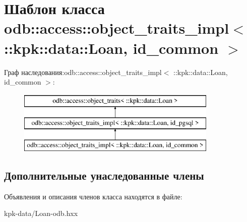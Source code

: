 \hypertarget{classodb_1_1access_1_1object__traits__impl_3_01_1_1kpk_1_1data_1_1_loan_00_01id__common_01_4}{}\section{Шаблон класса odb\+:\+:access\+:\+:object\+\_\+traits\+\_\+impl$<$ \+:\+:kpk\+:\+:data\+:\+:Loan, id\+\_\+common $>$}
\label{classodb_1_1access_1_1object__traits__impl_3_01_1_1kpk_1_1data_1_1_loan_00_01id__common_01_4}
Граф наследования\+:odb\+:\+:access\+:\+:object\+\_\+traits\+\_\+impl$<$ \+:\+:kpk\+:\+:data\+:\+:Loan, id\+\_\+common $>$\+:\begin{figure}[H]
\begin{center}
\leavevmode
\includegraphics[height=3.000000cm]{classodb_1_1access_1_1object__traits__impl_3_01_1_1kpk_1_1data_1_1_loan_00_01id__common_01_4}
\end{center}
\end{figure}
\subsection*{Дополнительные унаследованные члены}


Объявления и описания членов класса находятся в файле\+:\begin{DoxyCompactItemize}
\item 
kpk-\/data/Loan-\/odb.\+hxx\end{DoxyCompactItemize}
